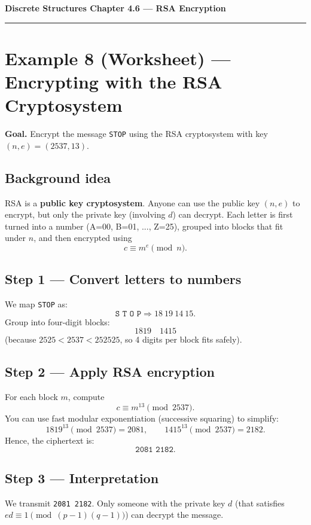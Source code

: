\documentclass[12pt]{article}
\begin{document}
{\large \textbf{Discrete Structures \quad Chapter 4.6 — RSA Encryption}}

\hrule
\vspace{0.6em}

\section*{Example 8 (Worksheet) — Encrypting with the RSA Cryptosystem}

\textbf{Goal.} Encrypt the message \texttt{STOP} using the RSA cryptosystem with key \((n,e) = (2537, 13)\).

\subsection*{Background idea}
RSA is a \textbf{public key cryptosystem}. Anyone can use the public key \((n,e)\) to encrypt, but only the private key (involving \(d\)) can decrypt.  
Each letter is first turned into a number (A=00, B=01, ..., Z=25), grouped into blocks that fit under \(n\), and then encrypted using
\[
c \equiv m^e \pmod{n}.
\]

\subsection*{Step 1 — Convert letters to numbers}
We map \texttt{STOP} as:
\[
\texttt{S T O P} \Rightarrow 18\ 19\ 14\ 15.
\]
Group into four-digit blocks:
\[
1819 \quad 1415
\]
(because \(2525 < 2537 < 252525\), so 4 digits per block fits safely).

\subsection*{Step 2 — Apply RSA encryption}
For each block \(m\), compute
\[
c \equiv m^{13} \pmod{2537}.
\]
You can use fast modular exponentiation (successive squaring) to simplify:
\[
1819^{13} \pmod{2537} = 2081, \qquad 1415^{13} \pmod{2537} = 2182.
\]
Hence, the ciphertext is:
\[
\boxed{\texttt{2081 2182}}.
\]

\subsection*{Step 3 — Interpretation}
We transmit \texttt{2081 2182}. Only someone with the private key \(d\) (that satisfies \(ed \equiv 1 \pmod{(p-1)(q-1)}\)) can decrypt the message.
\end{document}

